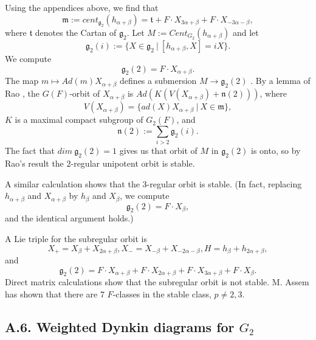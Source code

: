\documentclass[12pt,letterpaper]{amsart}
\begin{document}
Using the appendices above, we find that
\[
{\mathfrak m}:=cent_{{\mathfrak g}_2}(h_{\alpha +\beta})
={\mathfrak t}+F\cdot X_{3\alpha +\beta}+F\cdot X_{-3\alpha -\beta},
\]
where ${\mathfrak t}$ denotes the Cartan of ${\mathfrak g}_2$. Let
$M:=Cent_{G_2}(h_{\alpha +\beta})$ and let
\[
{\mathfrak g}_2(i):=\{X\in{\mathfrak g}_2\ |\ [h_{\alpha +\beta},X]=iX\}.
\]
We compute
\[
{\mathfrak g}_2(2)=F\cdot X_{\alpha +\beta}.
\]
The map $m\longmapsto Ad(m)X_{\alpha +\beta}$ defines a submersion
$M\rightarrow {\mathfrak g}_2(2)$ \cite[ch III, \S 4.14]{SS86}. By a lemma of
Rao \cite{Ra72}, the $G(F)$-orbit of $X_{\alpha +\beta}$ is
$Ad(K(V(X_{\alpha +\beta})+{\mathfrak n}(2)))$, where
\[
V(X_{\alpha +\beta})=\{ad(X)X_{\alpha +\beta}\ |\ X\in {\mathfrak m}\},
\]
$K$ is a maximal compact subgroup of $G_2(F)$, and
\[
{\mathfrak n}(2):=\sum_{i >2}{\mathfrak g}_2(i).
\]
The fact that $dim\ {\mathfrak g}_2(2)=1$ gives us that orbit
of $M$ in ${\mathfrak g}_2(2)$ is onto,
so by Rao's result the $2$-regular unipotent orbit is stable.

A similar calculation shows that the $3$-regular orbit is stable.
(In fact, replacing $h_{\alpha +\beta}$ and $X_{\alpha +\beta}$
by $h_{\beta}$ and $X_{\beta}$, we compute
\[
{\mathfrak g}_2(2)=F\cdot X_{\beta},
\]
and the identical argument holds.)

A Lie triple for the subregular orbit is
\[
X_+=X_\beta+X_{2\alpha +\beta},
X_-=X_{-\beta}+X_{-2\alpha -\beta},
H=h_{\beta}+h_{2\alpha +\beta},
\]
and
\[
{\mathfrak g}_2(2)=
F\cdot X_{\alpha +\beta}+F\cdot X_{2\alpha +\beta}
+F\cdot X_{3\alpha +\beta}+F\cdot X_{\beta}.
\]
Direct matrix calculations show that the subregular orbit is
not stable. M. Assem has shown that there are 7 $F$-classes in
the stable class, $p\not= 2,3$.

\iffalse
\subsection*{A.6. Weighted Dynkin diagrams for $G_2$}
\end{document}
